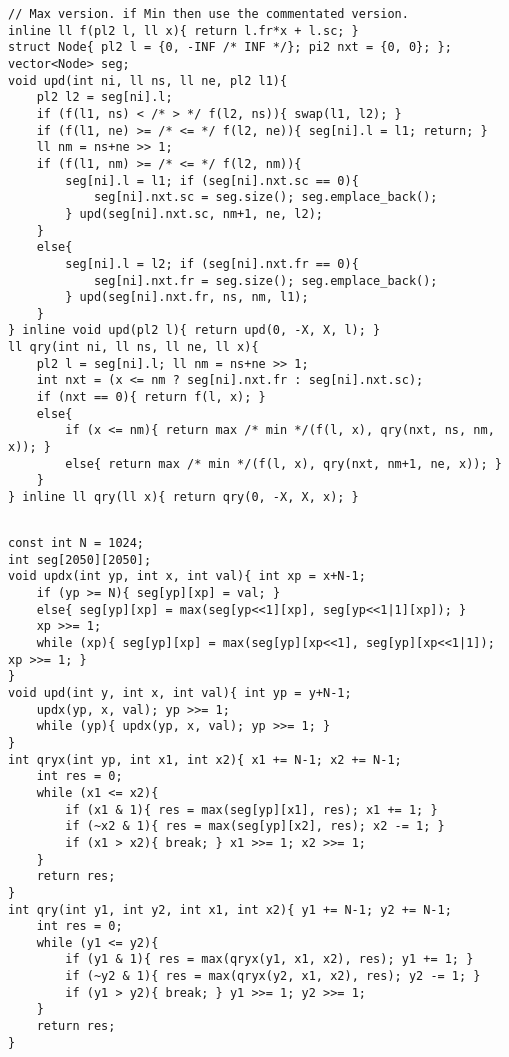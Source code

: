 \documentclass[landscape, 8pt, a4paper, oneside, twocolumn]{extarticle}
\begin{document}
\begin{verbatim}
// Max version. if Min then use the commentated version.
inline ll f(pl2 l, ll x){ return l.fr*x + l.sc; }
struct Node{ pl2 l = {0, -INF /* INF */}; pi2 nxt = {0, 0}; };
vector<Node> seg;
void upd(int ni, ll ns, ll ne, pl2 l1){
    pl2 l2 = seg[ni].l;
    if (f(l1, ns) < /* > */ f(l2, ns)){ swap(l1, l2); }
    if (f(l1, ne) >= /* <= */ f(l2, ne)){ seg[ni].l = l1; return; }
    ll nm = ns+ne >> 1;
    if (f(l1, nm) >= /* <= */ f(l2, nm)){
        seg[ni].l = l1; if (seg[ni].nxt.sc == 0){
            seg[ni].nxt.sc = seg.size(); seg.emplace_back();
        } upd(seg[ni].nxt.sc, nm+1, ne, l2);
    }
    else{
        seg[ni].l = l2; if (seg[ni].nxt.fr == 0){
            seg[ni].nxt.fr = seg.size(); seg.emplace_back();
        } upd(seg[ni].nxt.fr, ns, nm, l1);
    }
} inline void upd(pl2 l){ return upd(0, -X, X, l); }
ll qry(int ni, ll ns, ll ne, ll x){
    pl2 l = seg[ni].l; ll nm = ns+ne >> 1;
    int nxt = (x <= nm ? seg[ni].nxt.fr : seg[ni].nxt.sc);
    if (nxt == 0){ return f(l, x); }
    else{
        if (x <= nm){ return max /* min */(f(l, x), qry(nxt, ns, nm, x)); }
        else{ return max /* min */(f(l, x), qry(nxt, nm+1, ne, x)); }
    }
} inline ll qry(ll x){ return qry(0, -X, X, x); }
\end{verbatim}
\subsection{}
\begin{verbatim}
const int N = 1024;
int seg[2050][2050];
void updx(int yp, int x, int val){ int xp = x+N-1;
	if (yp >= N){ seg[yp][xp] = val; }
	else{ seg[yp][xp] = max(seg[yp<<1][xp], seg[yp<<1|1][xp]); }
	xp >>= 1;
	while (xp){ seg[yp][xp] = max(seg[yp][xp<<1], seg[yp][xp<<1|1]); xp >>= 1; }
}
void upd(int y, int x, int val){ int yp = y+N-1;
	updx(yp, x, val); yp >>= 1;
	while (yp){ updx(yp, x, val); yp >>= 1; }
}
int qryx(int yp, int x1, int x2){ x1 += N-1; x2 += N-1;
	int res = 0;
	while (x1 <= x2){
		if (x1 & 1){ res = max(seg[yp][x1], res); x1 += 1; }
		if (~x2 & 1){ res = max(seg[yp][x2], res); x2 -= 1; }
		if (x1 > x2){ break; } x1 >>= 1; x2 >>= 1;
	}
	return res;
}
int qry(int y1, int y2, int x1, int x2){ y1 += N-1; y2 += N-1;
	int res = 0;
	while (y1 <= y2){
		if (y1 & 1){ res = max(qryx(y1, x1, x2), res); y1 += 1; }
		if (~y2 & 1){ res = max(qryx(y2, x1, x2), res); y2 -= 1; }
		if (y1 > y2){ break; } y1 >>= 1; y2 >>= 1;
	}
	return res;
}
\end{verbatim}
\end{document}
